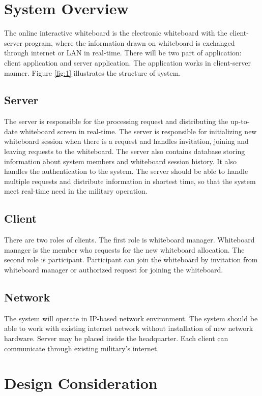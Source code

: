 \documentclass[conference]{IEEEtran}
\begin{document}
\section{System Overview}
The online interactive whiteboard is the electronic whiteboard with the client-server program, where the information drawn on whiteboard is exchanged through internet or LAN in real-time. There will be two part of application: client application and server application. The application works in client-server manner.  Figure \ref{fig:1} illustrates the structure of system.  
\subsection{Server}
The server is responsible for the processing request and distributing the up-to-date whiteboard screen in real-time. The server is responsible for initializing new whiteboard session when there is a request and handles invitation, joining and leaving requests to the whiteboard. The server also contains database storing information about system members and whiteboard session history. It also handles the authentication to the system. The server should be able to handle multiple requests and distribute information in shortest time, so that the system meet real-time need in the military operation.
\subsection{Client}
There are two roles of clients. The first role is whiteboard manager. Whiteboard manager is the member who requests for the new whiteboard allocation. The second role is participant. Participant can join the whiteboard by invitation from whiteboard manager or authorized request for joining the whiteboard. 
\subsection{Network}
The system will operate in IP-based network environment. The system should be able to work with existing internet network without installation of new network hardware.  Server may be placed inside the headquarter. Each client can communicate through existing military's internet. 


\section{Design Consideration}
\end{document}
